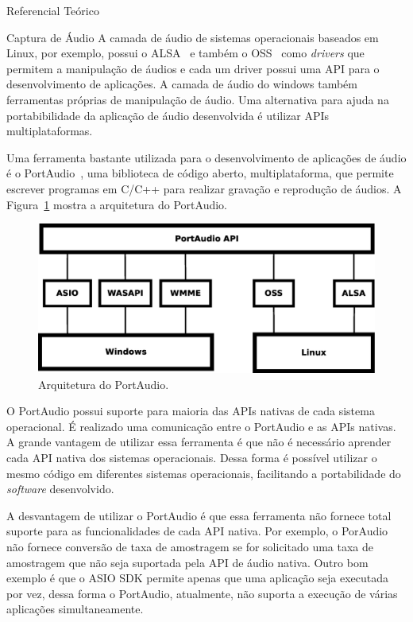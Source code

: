 \begin{chapter}{Referencial Teórico}
\begin{section}{Captura de Áudio}
A camada de áudio de sistemas operacionais baseados em Linux, por
exemplo, possui o ALSA~\cite{alsa} e também o OSS~\cite{oss} como
\textit{drivers} que permitem a manipulação de áudios e cada um driver possui
uma API para o desenvolvimento de aplicações. A camada de áudio do windows
também ferramentas próprias de manipulação de áudio. Uma alternativa para ajuda
na portabibilidade da aplicação de áudio desenvolvida é utilizar APIs
multiplataformas.

Uma ferramenta bastante utilizada para o desenvolvimento de aplicações de áudio
é o PortAudio~\cite{portaudio}, uma biblioteca de código aberto,
multiplataforma, que permite escrever programas em C/C++ para realizar gravação
e reprodução de áudios. A Figura~\ref{fig:portaudio} mostra a arquitetura do
PortAudio.

\begin{figure}[!h]
	\centering
	\begin{minipage}[c]{\textwidth}
	\centering
	\includegraphics[width=0.7\linewidth]{fig/portaudio}
	\caption{Arquitetura do PortAudio.}
	\label{fig:portaudio}
	\end{minipage}
\end{figure} 

O PortAudio possui suporte para maioria das APIs nativas de cada sistema
operacional. É realizado uma comunicação entre o PortAudio e as APIs nativas. A
grande vantagem de utilizar essa ferramenta é que não é necessário aprender cada
API nativa dos sistemas operacionais. Dessa forma é possível utilizar o mesmo
código em diferentes sistemas operacionais, facilitando a portabilidade do
\textit{software} desenvolvido.

A desvantagem de utilizar o PortAudio é que essa ferramenta não fornece total
suporte para as funcionalidades de cada API nativa. Por exemplo, o PorAudio não
fornece conversão de taxa de amostragem se for solicitado uma taxa de amostragem
que não seja suportada pela API de áudio nativa. Outro bom exemplo é que o ASIO
SDK permite apenas que uma aplicação seja executada por vez, dessa forma o
PortAudio, atualmente, não suporta a execução de várias aplicações
simultaneamente.

\end{section}


\end{chapter}
